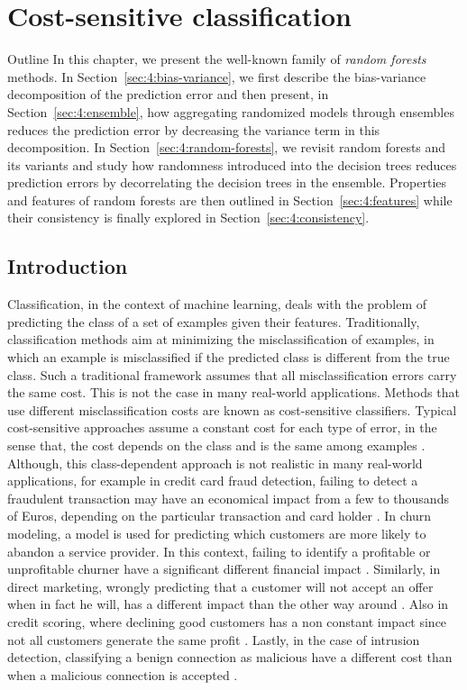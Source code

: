 \chapter{Cost-sensitive classification}

\begin{remark}{Outline}
In this chapter, we present the well-known family of \textit{random forests}
methods. In Section~\ref{sec:4:bias-variance}, we first describe the bias-variance
decomposition of the prediction error and then present, in
Section~\ref{sec:4:ensemble}, how aggregating randomized models through
ensembles reduces the prediction error by decreasing the variance term in this
decomposition. In Section~\ref{sec:4:random-forests}, we revisit random forests
and its variants and study how randomness introduced into the decision trees
reduces prediction errors by decorrelating the decision
trees in the ensemble. Properties and features of random forests are then outlined
in Section~\ref{sec:4:features} while their consistency
is finally explored in Section~\ref{sec:4:consistency}.
\end{remark}


\section{Introduction}

  Classification, in the context of machine learning, deals with the problem of predicting the class
  of a set of examples given their features. Traditionally, classification methods aim at 
  minimizing the misclassification of examples, in which an example is misclassified if the 
  predicted class is different from the true class. Such a traditional framework assumes that all 
  misclassification errors carry the same cost. This is not the case in many real-world 
  applications. Methods that use different misclassification costs are known as cost-sensitive 
  classifiers. Typical cost-sensitive approaches assume a constant cost for each type of error, in 
	the sense that, the cost depends on the class and is the same among examples 
	\citep{Elkan2001,Kim2012}. 
  Although, this class-dependent approach is not realistic in many real-world applications, for 
	example in credit card fraud detection, failing to detect a fraudulent transaction may have an 
  economical impact from a few to thousands of Euros, depending on the particular transaction and 
	card holder \citep{Sahin2013}. In churn modeling, a model is used for predicting which
	customers are more likely to abandon a service provider. In this context, failing to identify a 
	profitable or unprofitable churner have a significant different financial impact 
	\citep{Glady2009}. Similarly, in direct marketing, wrongly predicting that a customer will not 
	accept an offer when in fact he will, has a different impact than the other way around 
	\citep{Zadrozny2003}. Also in credit scoring, where declining good customers has a non constant 
	impact since not all 	customers generate the same profit \citep{Verbraken2014}. Lastly, in the 
	case of intrusion 	detection, classifying a benign connection as malicious have a different cost 
	than when a 	malicious connection is accepted \citep{Ma2011}.

